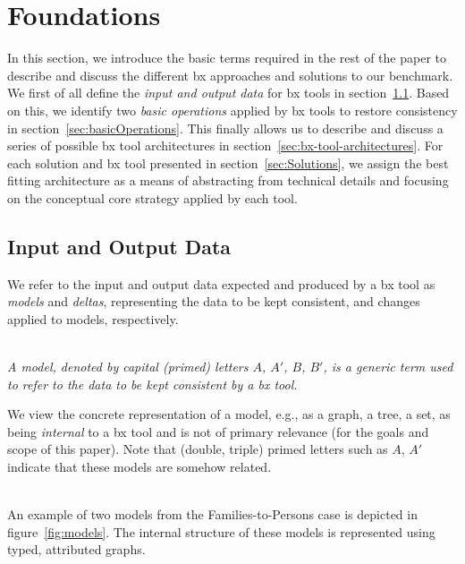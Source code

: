 \section{Foundations}
\label{sec:Foundations}


In this section, we introduce the basic terms required in the rest of the paper to describe and discuss the different bx approaches and solutions to our benchmark.
We first of all define the \emph{input and output data} for bx tools in section~\ref{sec:io-data}.
Based on this, we identify two \emph{basic operations} applied by bx tools to restore consistency in section~\ref{sec:basicOperations}.
This finally allows us to describe and discuss a series of possible bx tool architectures in section~\ref{sec:bx-tool-architectures}.
For each solution and bx tool presented in section~\ref{sec:Solutions}, we assign the best fitting architecture as a means of abstracting from technical details and focusing on the conceptual core strategy applied by each tool.   

\subsection{Input and Output Data}
\label{sec:io-data}

We refer to the input and output data expected and produced by a bx tool as \emph{models} and \emph{deltas}, representing the data to be kept consistent, and changes applied to models, respectively.  

\begin{definition}[Model]
\label{def: model}~\\
\emph{A model, denoted by capital (primed) letters $A$, $A'$, $B$, $B'$, is a generic term used to refer to the data to be kept consistent by a bx tool.}
\end{definition}
%
We view the concrete representation of a model, e.g., as a graph, a tree, a set, as being \emph{internal} to a bx tool and is not of primary relevance (for the goals and scope of this paper).
Note that (double, triple) primed letters such as $A$, $A'$ indicate that these models are somehow related.

\begin{example}[Models]~\\
An example of two models from the Families-to-Persons case is depicted in figure~\ref{fig:models}.
The internal structure of these models is represented using typed, attributed graphs.
\end{example}

